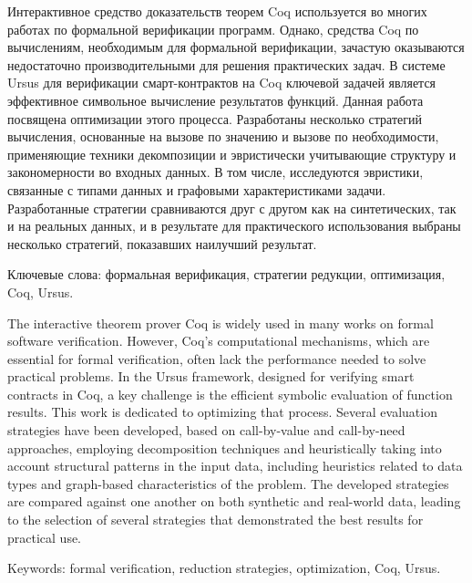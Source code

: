 \documentclass[../diploma.tex]{subfiles}
\begin{document}
Интерактивное средство доказательств теорем Coq используется во многих работах по формальной верификации программ. Однако, средства Coq по вычислениям, необходимым для формальной верификации, зачастую оказываются недостаточно производительными для решения практических задач. В системе Ursus для верификации смарт-контрактов на Coq ключевой задачей является эффективное символьное вычисление результатов функций. Данная работа посвящена оптимизации этого процесса. Разработаны несколько стратегий вычисления, основанные на вызове по значению и вызове по необходимости, применяющие техники декомпозиции и эвристически учитывающие структуру и закономерности во входных данных. В том числе, исследуются эвристики, связанные с типами данных и графовыми характеристиками задачи. Разработанные стратегии сравниваются друг с другом как на синтетических, так и на реальных данных, и в результате для практического использования выбраны несколько стратегий, показавших наилучший результат.

\vspace*{\fill}

Ключевые слова: формальная верификация, стратегии редукции, оптимизация, Coq, Ursus.

\newpage

The interactive theorem prover Coq is widely used in many works on formal software verification. However, Coq's computational mechanisms, which are essential for formal verification, often lack the performance needed to solve practical problems. In the Ursus framework, designed for verifying smart contracts in Coq, a key challenge is the efficient symbolic evaluation of function results. This work is dedicated to optimizing that process. Several evaluation strategies have been developed, based on call-by-value and call-by-need approaches, employing decomposition techniques and heuristically taking into account structural patterns in the input data, including heuristics related to data types and graph-based characteristics of the problem. The developed strategies are compared against one another on both synthetic and real-world data, leading to the selection of several strategies that demonstrated the best results for practical use.

\vspace*{\fill}

Keywords: formal verification, reduction strategies, optimization, Coq, Ursus.
\end{document}
